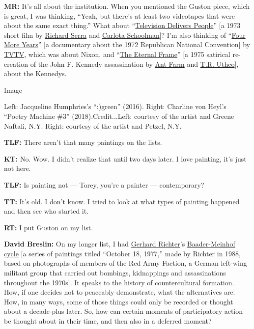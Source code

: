 \textbf{MR:} It's all about the institution. When you mentioned the
Guston piece, which is great, I was thinking, ``Yeah, but there's at
least two videotapes that were about the same exact thing.'' What about
``\href{https://www.moma.org/collection/works/118185}{Television
Delivers People}'' {[}a 1973 short film by
\href{https://www.nytimes.com/topic/person/richard-serra}{Richard Serra}
and \href{https://www.moma.org/artists/34941}{Carlota Schoolman}{]}? I'm
also thinking of
``\href{https://www.eai.org/titles/four-more-years}{Four More Years}''
{[}a documentary about the 1972 Republican National Convention{]} by
\href{http://www.vdb.org/artists/tvtv}{TVTV}, which was about Nixon, and
``\href{https://www.eai.org/titles/the-eternal-frame}{The Eternal
Frame}'' {[}a 1975 satirical re-creation of the John F. Kennedy
assassination by
\href{https://www.nytimes.com/2003/06/21/arts/doug-michels-radical-artist-and-architect-dies-at-59.html}{Ant
Farm} and \href{https://www.eai.org/artists/t-r-uthco/titles}{T.R.
Uthco}{]}, about the Kennedys.

Image

Left: Jacqueline Humphries's ``:)green'' (2016). Right: Charline von
Heyl's ``Poetry Machine \#3'' (2018).Credit...Left: courtesy of the
artist and Greene Naftali, N.Y. Right: courtesy of the artist and
Petzel, N.Y.

\textbf{TLF:} There aren't that many paintings on the lists.

\textbf{KT:} No. Wow. I didn't realize that until two days later. I love
painting, it's just not here.

\textbf{TLF:} Is painting not --- Torey, you're a painter ---
contemporary?

\textbf{TT:} It's old. I don't know. I tried to look at what types of
painting happened and then see who started it.

\textbf{RT:} I put Guston on my list.

\textbf{David Breslin:} On my longer list, I had
\href{https://www.nytimes.com/2002/01/27/magazine/an-artist-beyond-isms.html}{Gerhard
Richter}'s
\href{https://www.gerhard-richter.com/en/art/paintings/photo-paintings/baader-meinhof-56}{Baader-Meinhof
cycle} {[}a series of paintings titled ``October 18, 1977,'' made by
Richter in 1988, based on photographs of members of the Red Army
Faction, a German left-wing militant group that carried out bombings,
kidnappings and assassinations throughout the 1970s{]}. It speaks to the
history of countercultural formation. How, if one decides not to
peaceably demonstrate, what the alternatives are. How, in many ways,
some of those things could only be recorded or thought about a
decade-plus later. So, how can certain moments of participatory action
be thought about in their time, and then also in a deferred moment?

